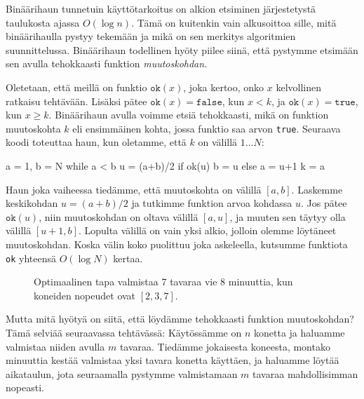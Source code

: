 Binäärihaun tunnetuin käyttötarkoitus on alkion etsiminen
järjestetystä taulukosta ajassa $O(\log n)$.
Tämä on kuitenkin vain alkusoittoa sille,
mitä binää\-rihaulla pystyy tekemään ja mikä on sen
merkitys algoritmien suunnittelussa.
Binääri\-haun todellinen hyöty piilee siinä,
että pystymme etsimään sen avulla tehokkaasti funktion \emph{muutoskohdan}.

Oletetaan, että meillä on funktio $\texttt{ok}(x)$,
joka kertoo, onko $x$ kelvollinen ratkaisu tehtävään.
Lisäksi pätee $\texttt{ok}(x)=\texttt{false}$, kun $x<k$,
ja $\texttt{ok}(x)=\texttt{true}$, kun $x \ge k$.
Binäärihaun avulla voimme etsiä tehokkaasti,
mikä on funktion muutoskohta $k$
eli ensimmäinen kohta, jossa funktio saa arvon \texttt{true}.
Seuraava koodi toteuttaa haun, kun oletamme, että $k$ on välillä $1 \dots N$:

\begin{code}
a = 1, b = N
while a < b
    u = (a+b)/2
    if ok(u)
        b = u
    else
        a = u+1
k = a
\end{code}

Haun joka vaiheessa tiedämme, että muutoskohta on välillä $[a,b]$.
Laskemme keskikohdan $u=(a+b)/2$ ja tutkimme funktion arvoa kohdassa $u$.
Jos pätee $\texttt{ok}(u)$, niin muutoskohdan on oltava välillä $[a,u]$,
ja muuten sen täytyy olla välillä $[u+1,b]$.
Lopulta välillä on vain yksi alkio, jolloin olemme löytäneet muutoskohdan.
Koska välin koko puolittuu joka askeleella,
kutsumme funktiota \texttt{ok} yhteensä $O(\log N)$ kertaa.

\begin{figure}
\center
{}
\caption{Optimaalinen tapa valmistaa 7 tavaraa vie 8 minuuttia,
kun koneiden nopeudet ovat $[2,3,7]$.}
\label{fig:optkon}
\end{figure}

Mutta mitä hyötyä on siitä, että löydämme tehokkaasti funktion muutoskohdan?
Tämä selviää seuraavassa tehtävässä:
Käytössämme on $n$ konetta
ja haluamme valmistaa niiden avulla $m$ tavaraa.
Tiedämme jokaisesta koneesta,
montako minuuttia kestää valmistaa yksi tavara konetta käyttäen,
ja haluamme löytää aikataulun, jota seuraamalla pystymme valmistamaan
$m$ tavaraa mahdollisimman nopeasti.

